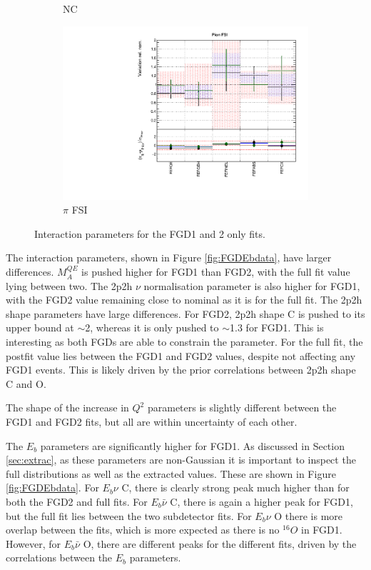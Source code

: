 \begin{figure}
\begin{subfigure}{0.49\textwidth}
  \caption{NC}
\end{subfigure}
\begin{subfigure}{0.49\textwidth}
  \centering
  \includegraphics[width=0.9\linewidth]{figs/fgdfitsxsec_5}
  \caption{$\pi$ FSI}
\end{subfigure}
\caption{Interaction parameters for the FGD1 and 2 only fits.}
\label{fig:fgdxsec}
\end{figure}

The interaction parameters, shown in Figure \ref{fig:FGDEbdata}, have larger differences. $M_{A}^{QE}$ is pushed higher for FGD1 than FGD2, with the full fit value lying between two. The 2p2h $\nu$ normalisation parameter is also higher for FGD1, with the FGD2 value remaining close to nominal as it is for the full fit. The 2p2h shape parameters have large differences. For FGD2, 2p2h shape C is pushed to its upper bound at $\sim$2, whereas it is only pushed to $\sim$1.3 for FGD1. This is interesting as both FGDs are able to constrain the parameter. For the full fit, the postfit value lies between the FGD1 and FGD2 values, despite not affecting any FGD1 events. This is likely driven by the prior correlations between 2p2h shape C and O.

The shape of the increase in $Q^2$ parameters is slightly different between the FGD1 and FGD2 fits, but all are within uncertainty of each other.

The $E_b$ parameters are significantly higher for FGD1. As discussed in Section \ref{sec:extrac}, as these parameters are non-Gaussian it is important to inspect the full distributions as well as the extracted values. These are shown in Figure \ref{fig:FGDEbdata}. For $E_b \nu$ C, there is clearly strong peak much higher than for both the FGD2 and full fits. For $E_b \bar{\nu}$ C, there is again a higher peak for FGD1, but the full fit lies between the two subdetector fits. For $E_b \nu$ O there is more overlap between the fits, which is more expected as there is no $^{16}O$ in FGD1. However, for $E_b \bar{\nu}$ O, there are different peaks for the different fits, driven by the correlations between the $E_b$ parameters.

